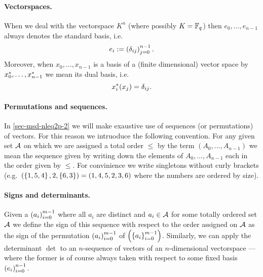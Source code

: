 \paragraph{Vectorspaces.} When we deal with the vectorspace $K^n$ (where possibly $K=\mathbb{F}_{q}$) then $e_0,\ldots,e_{n-1}$ always denotes the standard basis, i.e.
$$
e_i:=\seq{\delta_{ij}}_{j=0}^{n-1}.
$$
Moreover, when $x_0,\ldots,x_{n-1}$ is a basis of a (finite dimensional) vector space by ${x}^{\ast}_0,\ldots,{x}^{\ast}_{n-1}$ we mean its dual basis, i.e.
$$
{x}^{\ast}_i(x_j)=\delta_{ij}.
$$

\paragraph{Permutations and sequences.} In \autoref{sec-msd-nleq2p-2} we will make exaustive use of sequences (or permutations) of vectors. For this reason we intruoduce the following convention. For any given set $\mathcal{A}$ on which we are assigned a total order $\leq$ by the term $(A_0,\ldots,A_{n-1})$ we mean the sequence given by writing down the elements of $A_0, \ldots, A_{n-1}$ each in the order given by $\leq$. For convinience we write singletons without curly brackets (e.g.~$\seq{\set{1,5,4},2,\set{6,3}}=\seq{1,4,5,2,3,6}$ where the numbers are ordered by size).

\paragraph{Signs and determinants.} Given a $\seq{a_i}_{i=0}^{m-1}$ where all $a_i$ are distinct and $a_i\in\mathcal{A}$ for some totally ordered set $\mathcal{A}$ we define the sign of this sequence with respect to the order assigned on $\mathcal{A}$ as the sign of the permutation $\seq{a_i}_{i=0}^{m-1}$ of $\seq{\set{a_i}_{i=0}^{m-1}}$. Similarly, we can apply the determinant $\det$ to an $n$-sequence of vectors of an $n$-dimensional vectorspace --- where the former is of course always taken with respect to some fixed basis $\seq{e_i}_{i=0}^{n-1}$.




